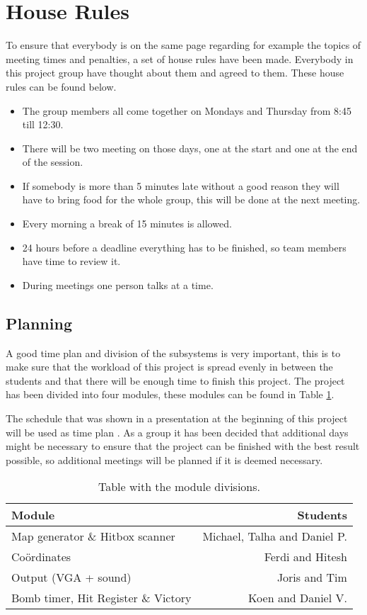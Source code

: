\section{House Rules}
To ensure that everybody is on the same page regarding for example the topics of meeting times and penalties, a set of house rules have been made. Everybody in this project group have thought about them and agreed to them. These house rules can be found below.

\begin{itemize}[noitemsep]
    \item The group members all come together on Mondays and Thursday from 8:45 till 12:30.
    \item There will be two meeting on those days, one at the start and one at the end of the session.
    \item If somebody is more than 5 minutes late without a good reason they will have to bring food for the whole group, this will be done at the next meeting.
    \item Every morning a break of 15 minutes is allowed.
    \item 24 hours before a deadline everything has to be finished, so team members have time to review it. 
    \item During meetings one person talks at a time.
\end{itemize}

\subsection{Planning}
A good time plan and division of the subsystems is very important, this is to make sure that the workload of this project is spread evenly in between the students and that there will be enough time to finish this project. The project has been divided into four modules, these modules can be found in Table \ref{tab:mod_div}.

The schedule that was shown in a presentation at the beginning of this project will be used as time plan \cite{Presentation}. As a group it has been decided that additional days might be necessary to ensure that the project can be finished with the best result possible, so additional meetings will be planned if it is deemed necessary.

\begin{table}[ht!]
    \centering
    \caption{Table with the module divisions.}
    \begin{tabular}{|l|r|}
    \hline
    Module                              & Students \\
    \hline
    Map generator \& Hitbox scanner     &  Michael, Talha and Daniel P.\\
    Coördinates                         & Ferdi and Hitesh\\
    Output (VGA + sound)                & Joris and Tim\\
    Bomb timer, Hit Register \& Victory & Koen and Daniel V.\\
     \hline
    \end{tabular}
    
    \label{tab:mod_div}
\end{table}